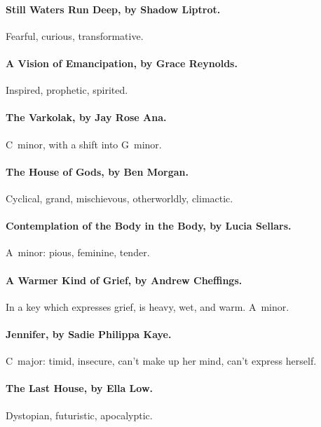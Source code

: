 \paragraph{Still Waters Run Deep, by Shadow Liptrot.} %
Fearful, curious, transformative. 

\paragraph{A Vision of Emancipation, by Grace Reynolds.} %
Inspired, prophetic, spirited.

\paragraph{The Varkolak, by Jay Rose Ana.} %
C~minor, with a shift into G~minor.

\paragraph{The House of Gods, by Ben Morgan.} %
Cyclical, grand, mischievous, otherworldly, climactic.

\paragraph{Contemplation of the Body in the Body, by Lucia Sellars.} %
A~minor: pious, feminine, tender.

\paragraph{A Warmer Kind of Grief, by Andrew Cheffings.} %
In a key which expresses grief, is heavy, wet, and warm. A\fl~minor.

\paragraph{Jennifer, by Sadie Philippa Kaye.} %
C\sh~major:
timid, insecure, can't make up her mind, can't express herself.

\paragraph{The Last House, by Ella Low.} %
Dystopian, futuristic, apocalyptic.
